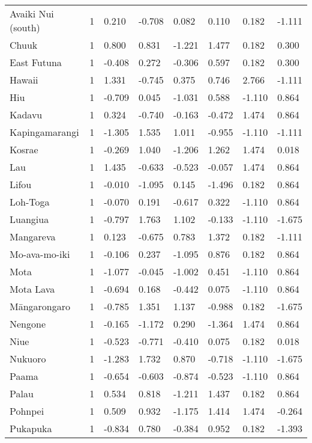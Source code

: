 \begin{longtable}{p{4.5cm}p{1.4cm}p{1.4cm}p{1.4cm}p{1.4cm}p{1.7cm}p{1.7cm}p{1.7cm}}
  Avaiki Nui (south) & 1 & 0.210 & -0.708 & 0.082 & 0.110 & 0.182 & -1.111 \\ 
  Chuuk & 1 & 0.800 & 0.831 & -1.221 & 1.477 & 0.182 & 0.300 \\ 
  East Futuna & 1 & -0.408 & 0.272 & -0.306 & 0.597 & 0.182 & 0.300 \\ 
  Hawaii & 1 & 1.331 & -0.745 & 0.375 & 0.746 & 2.766 & -1.111 \\ 
  Hiu & 1 & -0.709 & 0.045 & -1.031 & 0.588 & -1.110 & 0.864 \\ 
  Kadavu & 1 & 0.324 & -0.740 & -0.163 & -0.472 & 1.474 & 0.864 \\ 
  Kapingamarangi & 1 & -1.305 & 1.535 & 1.011 & -0.955 & -1.110 & -1.111 \\ 
  Kosrae & 1 & -0.269 & 1.040 & -1.206 & 1.262 & 1.474 & 0.018 \\ 
  Lau & 1 & 1.435 & -0.633 & -0.523 & -0.057 & 1.474 & 0.864 \\ 
  Lifou & 1 & -0.010 & -1.095 & 0.145 & -1.496 & 0.182 & 0.864 \\ 
  Loh-Toga & 1 & -0.070 & 0.191 & -0.617 & 0.322 & -1.110 & 0.864 \\ 
  Luangiua & 1 & -0.797 & 1.763 & 1.102 & -0.133 & -1.110 & -1.675 \\ 
  Mangareva & 1 & 0.123 & -0.675 & 0.783 & 1.372 & 0.182 & -1.111 \\ 
  Mo-ava-mo-iki & 1 & -0.106 & 0.237 & -1.095 & 0.876 & 0.182 & 0.864 \\ 
  Mota & 1 & -1.077 & -0.045 & -1.002 & 0.451 & -1.110 & 0.864 \\ 
  Mota Lava & 1 & -0.694 & 0.168 & -0.442 & 0.075 & -1.110 & 0.864 \\ 
  Māngarongaro & 1 & -0.785 & 1.351 & 1.137 & -0.988 & 0.182 & -1.675 \\ 
  Nengone & 1 & -0.165 & -1.172 & 0.290 & -1.364 & 1.474 & 0.864 \\ 
  Niue & 1 & -0.523 & -0.771 & -0.410 & 0.075 & 0.182 & 0.018 \\ 
  Nukuoro & 1 & -1.283 & 1.732 & 0.870 & -0.718 & -1.110 & -1.675 \\ 
  Paama & 1 & -0.654 & -0.603 & -0.874 & -0.523 & -1.110 & 0.864 \\ 
  Palau & 1 & 0.534 & 0.818 & -1.211 & 1.437 & 0.182 & 0.864 \\ 
  Pohnpei & 1 & 0.509 & 0.932 & -1.175 & 1.414 & 1.474 & -0.264 \\ 
  Pukapuka & 1 & -0.834 & 0.780 & -0.384 & 0.952 & 0.182 & -1.393 \\ 

\end{longtable}
